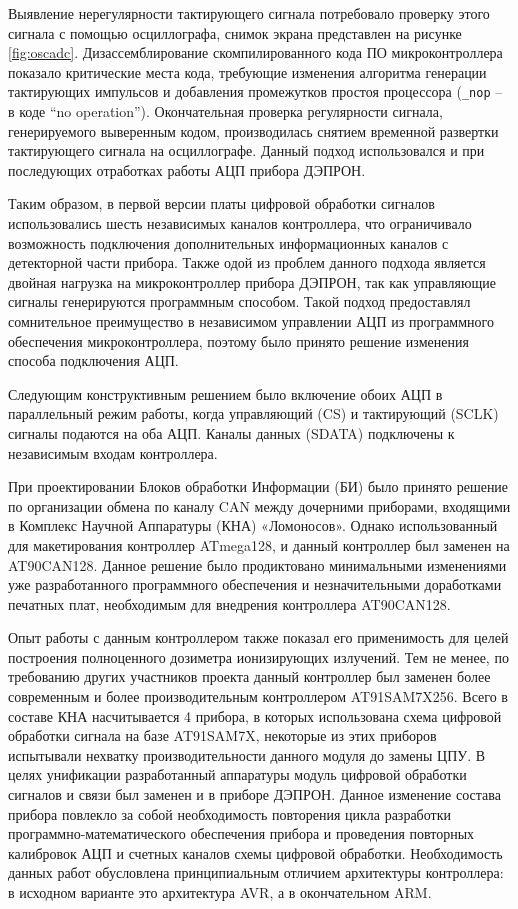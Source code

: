 Выявление нерегулярности тактирующего сигнала потребовало проверку этого сигнала с помощью осциллографа, снимок экрана представлен на рисунке \ref{fig:oscadc}. Дизассемблирование скомпилированного кода ПО микроконтроллера показало критические места кода, требующие изменения алгоритма генерации тактирующих импульсов и добавления промежутков простоя процессора (\texttt{\_nop} -- в коде ``no operation''). Окончательная проверка регулярности сигнала, генерируемого выверенным кодом, производилась снятием временной развертки тактирующего сигнала  на осциллографе. Данный подход использовался и при последующих отработках работы АЦП прибора ДЭПРОН.


Таким образом, в первой версии платы цифровой обработки сигналов использовались шесть независимых каналов контроллера, что ограничивало возможность подключения дополнительных информационных каналов с детекторной части прибора. Также одой из проблем данного подхода является двойная нагрузка на микроконтроллер прибора ДЭПРОН, так как управляющие сигналы генерируются программным способом. Такой подход предоставлял сомнительное преимущество в независимом управлении АЦП из программного обеспечения микроконтроллера, поэтому было принято решение изменения способа подключения АЦП.

Следующим конструктивным решением было включение обоих АЦП в параллельный режим работы, когда управляющий (CS) и тактирующий (SCLK) сигналы подаются на оба АЦП. Каналы данных (SDATA) подключены к независимым входам контроллера. 


При проектировании Блоков обработки Информации (БИ) было принято решение по организации обмена по каналу CAN между дочерними приборами, входящими в Комплекс Научной Аппаратуры (КНА) «Ломоносов». Однако использованный для макетирования контроллер ATmega128, и данный контроллер был заменен на AT90CAN128. Данное решение было продиктовано минимальными изменениями уже разработанного программного обеспечения и незначительными доработками печатных плат, необходимым для внедрения контроллера AT90CAN128.

Опыт работы с данным контроллером также показал его применимость для целей построения полноценного дозиметра ионизирующих излучений. Тем не менее, по требованию других участников проекта данный контроллер был заменен более современным и более производительным контроллером AT91SAM7X256. Всего в составе КНА насчитывается 4 прибора, в которых использована схема цифровой обработки сигнала на базе AT91SAM7X, некоторые из этих приборов испытывали нехватку производительности данного модуля до замены ЦПУ. В целях унификации разработанный аппаратуры модуль цифровой обработки сигналов и связи был заменен и в приборе ДЭПРОН. Данное изменение состава прибора повлекло за собой необходимость повторения цикла разработки программно-математического обеспечения прибора и проведения повторных калибровок АЦП и счетных каналов схемы цифровой обработки. Необходимость данных работ обусловлена принципиальным отличием архитектуры контроллера: в исходном варианте это архитектура AVR, а в окончательном ARM. 

